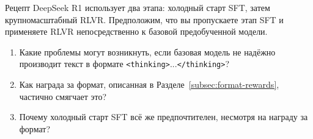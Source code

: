 \begin{exercise}
\label{ex:deepseek-recipe}
Рецепт DeepSeek R1 использует два этапа: холодный старт SFT, затем
крупномасштабный RLVR. Предположим, что вы пропускаете этап SFT и применяете RLVR
непосредственно к базовой предобученной модели.
\begin{enumerate}[label=(\alph*)]
\item Какие проблемы могут возникнуть, если базовая модель не надёжно
  производит текст в формате \texttt{<thinking>}...\texttt{</thinking>}?
\item Как награда за формат, описанная в
  Разделе~\ref{subsec:format-rewards}, частично смягчает это?
\item Почему холодный старт SFT всё же предпочтителен, несмотря на
  награду за формат?
\end{enumerate}
\end{exercise}
